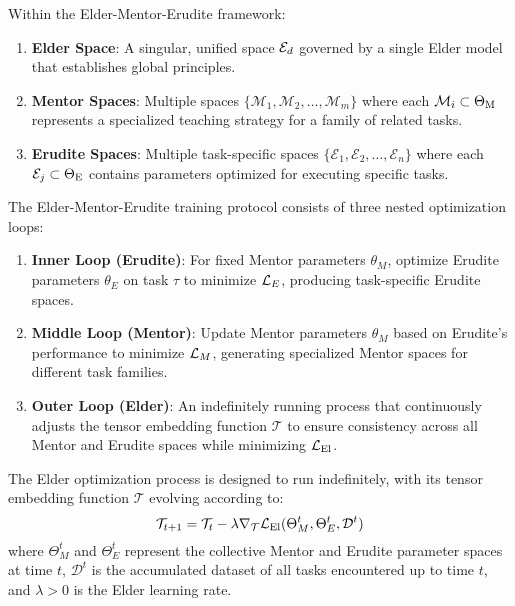 \begin{definition}
Within the Elder-Mentor-Erudite framework:
\begin{enumerate}
    \item \textbf{Elder Space}: A singular, unified space $\mathcal{E}_{d}$ governed by a single Elder model that establishes global principles.
    \item \textbf{Mentor Spaces}: Multiple spaces $\{\mathcal{M}_1, \mathcal{M}_2, \ldots, \mathcal{M}_m\}$ where each $\mathcal{M}_i \subset \Theta_{\text{M}}$ represents a specialized teaching strategy for a family of related tasks.
    \item \textbf{Erudite Spaces}: Multiple task-specific spaces $\{\mathcal{E}_1, \mathcal{E}_2, \ldots, \mathcal{E}_n\}$ where each $\mathcal{E}_j \subset \Theta_{\text{E}}$ contains parameters optimized for executing specific tasks.
\end{enumerate}
\end{definition}

\begin{definition}
The Elder-Mentor-Erudite training protocol consists of three nested optimization loops:
\begin{enumerate}
    \item \textbf{Inner Loop (Erudite)}: For fixed Mentor parameters $\theta_M$, optimize Erudite parameters $\theta_E$ on task $\tau$ to minimize $\mathcal{L}_E$, producing task-specific Erudite spaces.
    \item \textbf{Middle Loop (Mentor)}: Update Mentor parameters $\theta_M$ based on Erudite's performance to minimize $\mathcal{L}_M$, generating specialized Mentor spaces for different task families.
    \item \textbf{Outer Loop (Elder)}: An indefinitely running process that continuously adjusts the tensor embedding function $\mathcal{T}$ to ensure consistency across all Mentor and Erudite spaces while minimizing $\mathcal{L}_{\text{El}}$.
\end{enumerate}
\end{definition}

\begin{proposition}
The Elder optimization process is designed to run indefinitely, with its tensor embedding function $\mathcal{T}$ evolving according to:
\begin{equation}
\mathcal{T}_{t+1} = \mathcal{T}_t - \lambda \nabla_{\mathcal{T}} \mathcal{L}_{\text{El}}(\Theta_M^t, \Theta_E^t, \mathcal{D}^t)
\end{equation}
where $\Theta_M^t$ and $\Theta_E^t$ represent the collective Mentor and Erudite parameter spaces at time $t$, $\mathcal{D}^t$ is the accumulated dataset of all tasks encountered up to time $t$, and $\lambda > 0$ is the Elder learning rate.
\end{proposition}

